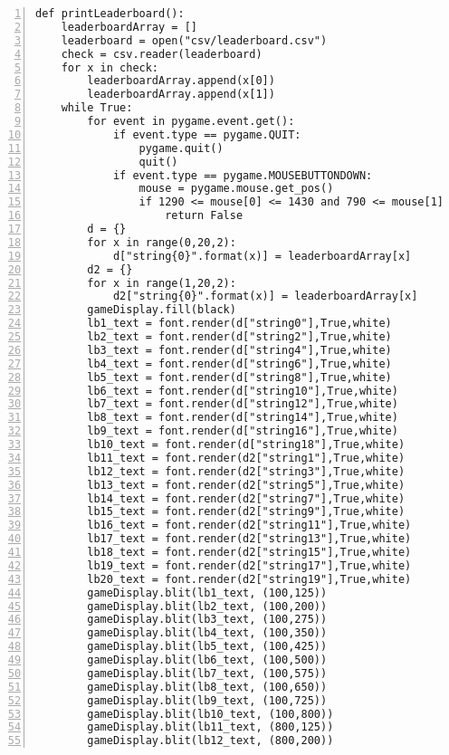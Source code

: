 \documentclass[12pt]{report}
\begin{document}
\tiny
\begin{Verbatim}[numbers=left, frame=single]
def printLeaderboard():
    leaderboardArray = []
    leaderboard = open("csv/leaderboard.csv")
    check = csv.reader(leaderboard)
    for x in check:
        leaderboardArray.append(x[0])
        leaderboardArray.append(x[1])
    while True:
        for event in pygame.event.get():
            if event.type == pygame.QUIT:
                pygame.quit()
                quit()
            if event.type == pygame.MOUSEBUTTONDOWN:
                mouse = pygame.mouse.get_pos()
                if 1290 <= mouse[0] <= 1430 and 790 <= mouse[1] <= 840:
                    return False
        d = {}
        for x in range(0,20,2):
            d["string{0}".format(x)] = leaderboardArray[x]
        d2 = {}
        for x in range(1,20,2):
            d2["string{0}".format(x)] = leaderboardArray[x]
        gameDisplay.fill(black)
        lb1_text = font.render(d["string0"],True,white)
        lb2_text = font.render(d["string2"],True,white)
        lb3_text = font.render(d["string4"],True,white)
        lb4_text = font.render(d["string6"],True,white)
        lb5_text = font.render(d["string8"],True,white)
        lb6_text = font.render(d["string10"],True,white)
        lb7_text = font.render(d["string12"],True,white)
        lb8_text = font.render(d["string14"],True,white)
        lb9_text = font.render(d["string16"],True,white)
        lb10_text = font.render(d["string18"],True,white)
        lb11_text = font.render(d2["string1"],True,white)
        lb12_text = font.render(d2["string3"],True,white)
        lb13_text = font.render(d2["string5"],True,white)
        lb14_text = font.render(d2["string7"],True,white)
        lb15_text = font.render(d2["string9"],True,white)
        lb16_text = font.render(d2["string11"],True,white)
        lb17_text = font.render(d2["string13"],True,white)
        lb18_text = font.render(d2["string15"],True,white)
        lb19_text = font.render(d2["string17"],True,white)
        lb20_text = font.render(d2["string19"],True,white)
        gameDisplay.blit(lb1_text, (100,125))
        gameDisplay.blit(lb2_text, (100,200))
        gameDisplay.blit(lb3_text, (100,275))
        gameDisplay.blit(lb4_text, (100,350))
        gameDisplay.blit(lb5_text, (100,425))
        gameDisplay.blit(lb6_text, (100,500))
        gameDisplay.blit(lb7_text, (100,575))
        gameDisplay.blit(lb8_text, (100,650))
        gameDisplay.blit(lb9_text, (100,725))
        gameDisplay.blit(lb10_text, (100,800))
        gameDisplay.blit(lb11_text, (800,125))
        gameDisplay.blit(lb12_text, (800,200))

\end{Verbatim}
\end{document}
